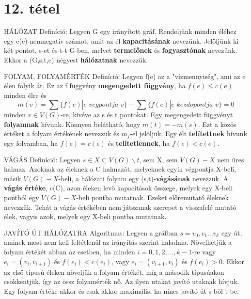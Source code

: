\section{12. tétel}

\begin{definicio}{
HÁLÓZAT Definíció}: Legyen G egy irányított gráf. Rendeljünk minden éléhez egy c(e) nemnegatív számot, amit az él \textbf{kapacitásának} nevezünk. Jelöljünk ki két pontot, s-et és t-t G-ben, melyet \textbf{termelőnek} és \textbf{fogyasztónak} nevezünk. Ekkor a (G,s,t,c) négyest \textbf{hálózatnak} nevezzük.
\end{definicio}
\begin{definicio}{
FOLYAM, FOLYAMÉRTÉK Definíció}: Legyen f(e) az a "vízmennyiség", ami az e élen folyik át. Ez az f függvény \textbf{megengedett függvény}, ha $f(e) \leq c(e)$ minden élre és
$$m(v) = \sum\{f(e)|e\,\,vegpontja\,\,v\} - \sum\{f(e) | e\,\,kezdopontja\,\,v\} = 0$$
minden $v\in V(G)$-re, kivéve az s és t pontokat. Egy megengedett függvényt \textbf{folyamnak} hívunk. Könnyen belátható, hogy $m(t) = -m(s)$. Ezt a közös értéket a folyam értékének nevezzük és $m_f$-el jelöljük. Egy élt \textbf{telítettnek} hívunk egy folyamban, ha $f(e) = c(e)$ és \textbf{telítetlennek}, ha $f(e) < c(e)$.
\end{definicio}
\begin{definicio}{
VÁGÁS Definíció}: Legyen $s \in X \subseteq V(G) \backslash {t}$, sem X, sem $V(G) - X$ nem üres halmaz. Azoknak az éleknek a C halmazát, melyeknek egyik végpontja X-beli, másik $V(G) - X$-beli, a hálózati folyam egy (s,t)-\textbf{vágásának} nevezzük. A \textbf{vágás értéke}, c(C), azon éleken levő kapacitások összege, melyek egy X-beli pontból egy $V(G) - X$-beli pontba mutatnak. Ezeket előremutató éleknek nevezzük. Tehát a vágás értékében nem játszanak szerepet a visszafelé mutató élek, vagyis azok, melyek egy X-beli pontba mutatnak.
\end{definicio}
\begin{tetel}{
JAVÍTÓ ÚT HÁLÓZATRA Algoritmus}: Legyen a gráfban $s = v_0, v_1... v_k$ egy út, aminek most nem kell feltétlenül az irányítás szerint haladnia. Növelhetjük a folyam értékét abban az esetben, ha minden $i = 0,1,2,...,k-1$-re vagy $e_i = (v_i , v_{i + 1})$ és $f(e_i) < c(e_i) $, vagy $e_i = (v_{i + 1} , v_i )$ és $f(e_i) > 0 $.
Ekkor az első típusú éleken növeljük a folyam értékét, míg a második típusúakon csökkentjük, így az össz folyamérték nő. Az ilyen utakat javító utaknak hívjuk.\\ Egy folyam értéke akkor és csak akkor maximális, ha nincs javító út s-ből t-be.
\end{tetel}
